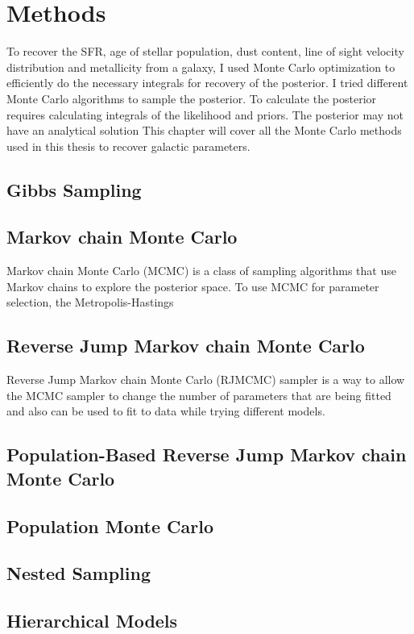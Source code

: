 \documentclass[a4paper,10pt]{book}
\begin{document}
\section{Methods}
To recover the SFR, age of stellar population, dust content, line of sight velocity distribution and metallicity from a galaxy, I used Monte Carlo optimization to efficiently do the necessary integrals for recovery of the posterior. I tried different Monte Carlo algorithms to sample the posterior. To calculate the posterior requires calculating integrals of the likelihood and priors. The posterior may not have an analytical solution This chapter will cover all the Monte Carlo methods used in this thesis to recover galactic parameters.

\subsection{Gibbs Sampling}

\subsection{Markov chain Monte Carlo}
Markov chain Monte Carlo (MCMC) is a class of sampling algorithms that use Markov chains to explore the posterior space. To use MCMC for parameter selection, the Metropolis-Hastings

\subsection{Reverse Jump Markov chain Monte Carlo}

Reverse Jump Markov chain Monte Carlo (RJMCMC) sampler is a way to allow the 
MCMC sampler to change the number of parameters that are being fitted and also 
can be used to fit to data while trying different models.

\subsection{Population-Based Reverse Jump Markov chain Monte Carlo}

\subsection{Population Monte Carlo}


\subsection{Nested Sampling}

\subsection{Hierarchical Models}
\end{document}
